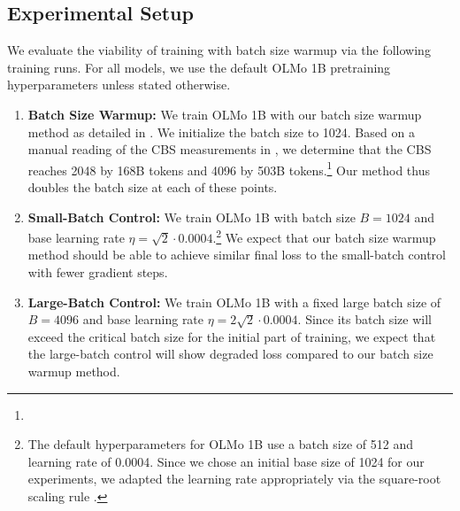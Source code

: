 \documentclass{article}
\newcommand{\hanna}[1]{\textcolor{purple}{[Hanna]: #1}}
\begin{document}
\subsection{Experimental Setup}
We evaluate the viability of training with batch size warmup via the following training runs. For all models, we use the default OLMo 1B pretraining hyperparameters unless stated otherwise.

\begin{enumerate}
    \item \textbf{Batch Size Warmup:} We train OLMo 1B with our batch size warmup method as detailed in .
    We initialize the batch size to 1024.
    Based on a manual reading of the CBS measurements in , we determine that the CBS reaches 2048 by 168B tokens and 4096 by 503B tokens.\footnote{}
    Our method thus doubles the batch size at each of these points.
    \item \textbf{Small-Batch Control:} We train OLMo 1B with batch size $B = 1024$ and base learning rate $\eta = \sqrt{2} \cdot 0.0004$.\footnote{The default hyperparameters for OLMo 1B use a batch size of 512 and learning rate of 0.0004. Since we chose an initial base size of 1024 for our experiments, we adapted the learning rate appropriately via the square-root scaling rule \citep{malladi2022sdes}.}
    We expect that our batch size warmup method should be able to achieve similar final loss to the small-batch control with fewer gradient steps.
    \item \textbf{Large-Batch Control:} We train OLMo 1B with a fixed large batch size of $B = 4096$ and base learning rate $\eta = 2\sqrt{2} \cdot 0.0004$.
    Since its batch size will exceed the critical batch size for the initial part of training, we expect that the large-batch control will show degraded loss compared to our batch size warmup method.
\end{enumerate}
\end{document}

